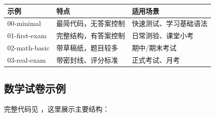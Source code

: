 \begin{center}
\begin{tabular}{lp{5cm}p{5cm}}
\hline
\textbf{示例} & \textbf{特点} & \textbf{适用场景} \\
\hline
00-minimal & 最简代码，无答案控制 & 快速测试、学习基础语法 \\
01-first-exam & 完整结构，有答案控制 & 日常测验、课堂小考 \\
02-math-basic & 带草稿纸，题目较多 & 期中/期末考试 \\
03-real-exam & 带密封线、评分标准 & 正式考试、月考 \\
\hline
\end{tabular}
\end{center}

\subsection{数学试卷示例}

完整代码见 ，这里展示主要结构：

